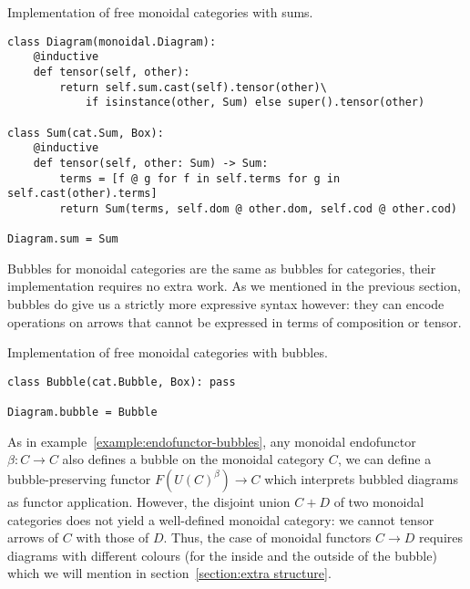 \begin{python}
{\normalfont Implementation of free monoidal categories with sums.}

\begin{verbatim}
class Diagram(monoidal.Diagram):
    @inductive
    def tensor(self, other):
        return self.sum.cast(self).tensor(other)\
            if isinstance(other, Sum) else super().tensor(other)

class Sum(cat.Sum, Box):
    @inductive
    def tensor(self, other: Sum) -> Sum:
        terms = [f @ g for f in self.terms for g in self.cast(other).terms]
        return Sum(terms, self.dom @ other.dom, self.cod @ other.cod)

Diagram.sum = Sum
\end{verbatim}
\end{python}

Bubbles for monoidal categories are the same as bubbles for categories, their implementation requires no extra work.
As we mentioned in the previous section, bubbles do give us a strictly more expressive syntax however: they can encode operations on arrows that cannot be expressed in terms of composition or tensor.

\begin{python}
{\normalfont Implementation of free monoidal categories with bubbles.}

\begin{verbatim}
class Bubble(cat.Bubble, Box): pass

Diagram.bubble = Bubble
\end{verbatim}
\end{python}

\begin{example}
As in example~\ref{example:endofunctor-bubbles}, any monoidal endofunctor $\beta : C \to C$ also defines a bubble on the monoidal category $C$, we can define a bubble-preserving functor $F(U(C)^\beta) \to C$ which interprets bubbled diagrams as functor application.
However, the disjoint union $C + D$ of two monoidal categories does not yield a well-defined monoidal category: we cannot tensor arrows of $C$ with those of $D$.
Thus, the case of monoidal functors $C \to D$ requires diagrams with different colours (for the inside and the outside of the bubble) which we will mention in section~\ref{section:extra structure}.
\end{example}

